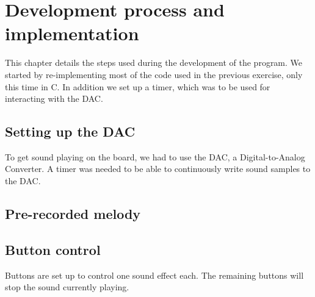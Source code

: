\section{Development process and implementation}
\label{chap:development_process}

This chapter details the steps used during the development of the program.
We started by re-implementing most of the code used in the previous exercise, only this time in C.
In addition we set up a timer, which was to be used for interacting with the DAC.


\subsection{Setting up the DAC}

To get sound playing on the board, we had to use the DAC, a Digital-to-Analog Converter.
A timer was needed to be able to continuously write sound samples to the DAC.



\subsection{Pre-recorded melody}


\subsection{Button control}

Buttons are set up to control one sound effect each. The remaining buttons will stop the sound currently playing.

